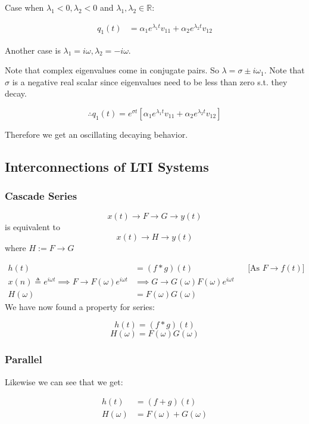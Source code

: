 \hrulefill

Case when $\lambda_1 < 0, \lambda_2 < 0$ and $\lambda_1, \lambda_2\in\mathbb R$:

\begin{align*}
    q_1(t)
    &=\alpha_1 e^{\lambda_1 t}v_{11}+\alpha_2 e^{\lambda_2 t}v_{12}
\end{align*}

Another case is $\lambda_1=i\omega, \lambda_2=-i\omega$.

Note that complex eigenvalues come in conjugate pairs. So $\lambda = \sigma\pm i\omega_1$.
Note that $\sigma$ is a negative real scalar since eigenvalues need to be less than zero s.t. they decay.

\[
    \therefore q_1(t) = e^{\sigma t} \left[\alpha_1 e^{\lambda_1 t}v_{11}+\alpha_2 e^{\lambda_2 t}v_{12}\right]
\]

Therefore we get an oscillating decaying behavior.

\subsection{Interconnections of LTI Systems}
\subsubsection{Cascade Series}
\[
    x(t) \to \boxed{F} \to \boxed{G} \to y(t)
\]
is equivalent to 
\[
    x(t) \to \boxed{H} \to y(t)
\]
where $\boxed{H} := \boxed{\boxed{F} \to \boxed{G}}$

\begin{align*}
    h(t) &= (f \ast g)(t)
    &&\text{[As $F\to f(t)$]}
    \\
    x(n)\triangleq e^{i\omega t}
    \implies F \to F(\omega) e^{i\omega t}
    &\implies G \to G(\omega) F(\omega) e^{i\omega t}
    \\
    H(\omega) &= F(\omega) G(\omega)
\end{align*}
We have now found a property for series:
\begin{shaded}
    \[
        h(t) = (f \ast g)(t)
    \]
    \[
        H(\omega) = F(\omega) G(\omega)
    \]
\end{shaded}

\subsubsection{Parallel}
Likewise we can see that we get:
\begin{shaded}
    \begin{align*}
        h(t) &= (f + g)(t)
        \\
        H(\omega) &= F(\omega) + G(\omega)
    \end{align*}
\end{shaded}

